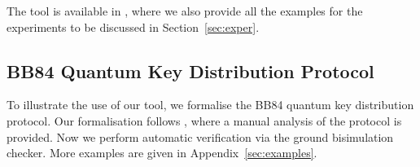 \documentclass[runningheads]{llncs}
\begin{document}
The tool is available in \cite{QBisim},
where we also provide all the examples for the experiments to be discussed in Section~\ref{sec:exper}. %

\subsection{BB84 Quantum Key Distribution Protocol}
\label{sec:bb84}
To illustrate the use of our tool,
we formalise the BB84 quantum key distribution protocol. Our formalisation follows \cite{DF12}, where a manual analysis of the protocol is provided. Now we perform automatic verification via the ground bisimulation checker.
More examples are given in Appendix~\ref{sec:examples}.

\end{document}
